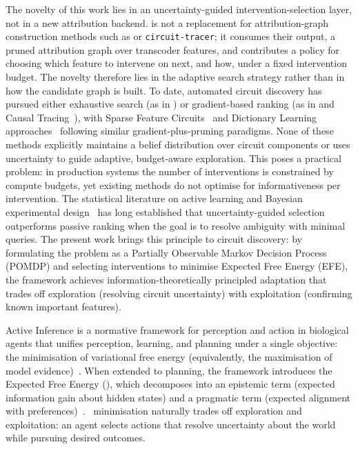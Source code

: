 The novelty of this work lies in an uncertainty-guided intervention-selection
layer, not in a new attribution backend. \ACD{} is not a replacement for
attribution-graph construction methods such as \EAP{} or \texttt{circuit-tracer};
it consumes their output, a pruned attribution graph over transcoder features, and
contributes a policy for choosing which feature to intervene on next, and how, under
a fixed intervention budget. The novelty therefore lies in the adaptive search
strategy rather than in how the candidate graph is built.
To date, automated circuit discovery has pursued either exhaustive search (as in
\ACDC) or gradient-based ranking (as in \EAP and Causal Tracing~\cite{Meng2022}),
with Sparse Feature Circuits~\cite{marks2024sparse} and Dictionary Learning
approaches~\cite{He2024} following similar gradient-plus-pruning paradigms. None of
these methods explicitly maintains a belief distribution over circuit components or
uses uncertainty to guide adaptive, budget-aware exploration. This poses a practical
problem: in production systems the number of interventions is constrained by
compute budgets, yet existing methods do not optimise for informativeness per
intervention. The statistical literature on active learning and Bayesian experimental
design~\cite{MacKay2003} has long established that uncertainty-guided selection
outperforms passive ranking when the goal is to resolve ambiguity with minimal
queries. The present work brings this principle to circuit discovery: by formulating
the problem as a Partially Observable Markov Decision Process (POMDP) and selecting
interventions to minimise Expected Free Energy (EFE), the framework achieves
information-theoretically principled adaptation that trades off exploration
(resolving circuit uncertainty) with exploitation (confirming known important
features).

Active Inference is a normative framework for perception and action in biological
agents that unifies perception, learning, and planning under a single objective: the
minimisation of variational free energy (equivalently, the maximisation of model
evidence)~\cite{Friston2010,Parr2022}. When extended to planning, the framework
introduces the Expected Free Energy (\EFE), which decomposes into an epistemic term
(expected information gain about hidden states) and a pragmatic term (expected
alignment with preferences)~\cite{Friston2015,DaCosta2020}. \EFE\
minimisation naturally trades off exploration and exploitation: an agent selects
actions that resolve uncertainty about the world while pursuing desired outcomes.

